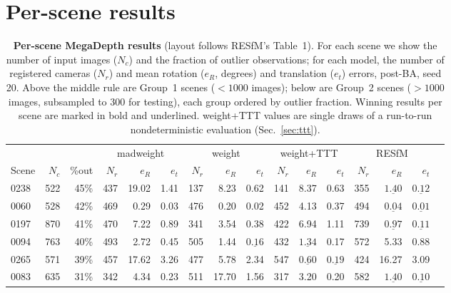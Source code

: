 \documentclass[10pt,twocolumn,letterpaper]{article}
\begin{document}
\section{Per-scene results}\label{sec:perscene}
\begin{table}[t]\centering\footnotesize
\caption{\textbf{Per-scene MegaDepth results} (layout follows RESfM's Table~1). For each
scene we show the number of input images ($N_c$) and the fraction of outlier
observations; for each model, the number of registered cameras ($N_r$) and mean
rotation ($e_R$, degrees) and translation ($e_t$) errors, post-BA, seed 20. Above the middle rule are Group~1
scenes ($<1000$ images); below are Group~2 scenes ($>1000$ images, subsampled to $300$
for testing), each group ordered by outlier fraction. Winning results per scene are
marked in bold and underlined. weight+TTT values are single draws of a run-to-run
nondeterministic evaluation (Sec.~\ref{sec:ttt}).}
\label{tab:supp_perscene_md}
\setlength{\tabcolsep}{2.5pt}%
\begin{tabular}{lrrrrrrrrrrrrrrr}
\toprule
& & & \multicolumn{3}{c}{madweight} & \multicolumn{3}{c}{weight} & \multicolumn{3}{c}{weight+TTT} & \multicolumn{3}{c}{RESfM}\\
\cmidrule(lr){4-6}\cmidrule(lr){7-9}\cmidrule(lr){10-12}\cmidrule(lr){13-15}
Scene & $N_c$ & \%out & $N_r$ & $e_R$ & $e_t$ & $N_r$ & $e_R$ & $e_t$ & $N_r$ & $e_R$ & $e_t$ & $N_r$ & $e_R$ & $e_t$\\
\midrule
0238 & 522 & 45\% & 437 & 19.02 & 1.41 & 137 & 8.23 & 0.62 & 141 & 8.37 & 0.63 & 355 & $\underline{\mathbf{1.40}}$ & $\underline{\mathbf{0.12}}$\\
0060 & 528 & 42\% & 469 & 0.29 & 0.03 & 476 & 0.20 & 0.02 & 452 & 4.13 & 0.37 & 494 & $\underline{\mathbf{0.04}}$ & $\underline{\mathbf{0.01}}$\\
0197 & 870 & 41\% & 470 & 7.22 & 0.89 & 341 & 3.54 & 0.38 & 422 & 6.94 & 1.11 & 739 & $\underline{\mathbf{0.97}}$ & $\underline{\mathbf{0.11}}$\\
0094 & 763 & 40\% & 493 & 2.72 & 0.45 & 505 & 1.44 & $\underline{\mathbf{0.16}}$ & 432 & $\underline{\mathbf{1.34}}$ & 0.17 & 572 & 5.33 & 0.88\\
0265 & 571 & 39\% & 457 & 17.62 & 3.26 & 477 & 5.78 & 2.34 & 547 & $\underline{\mathbf{0.60}}$ & $\underline{\mathbf{0.19}}$ & 424 & 16.27 & 3.09\\
0083 & 635 & 31\% & 342 & 4.34 & 0.23 & 511 & 17.70 & 1.56 & 317 & 3.20 & 0.20 & 582 & $\underline{\mathbf{1.40}}$ & $\underline{\mathbf{0.10}}$\\

\end{tabular}
\end{table}
\end{document}
